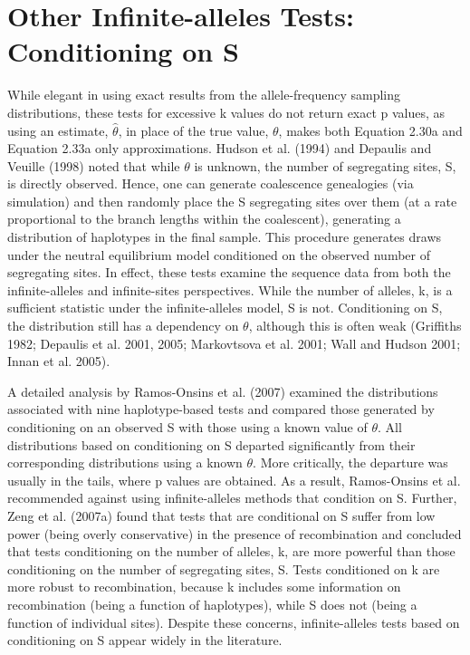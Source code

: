\documentclass{article}
\begin{document}
\section{Other Infinite-alleles Tests: Conditioning on S}
While elegant in using exact results from the allele-frequency sampling distributions, these tests for excessive k values do not return exact p values, as using an estimate,  $ \hat{\theta} $, in place of the true value,  $ \theta $, makes both Equation 2.30a and Equation 2.33a only approximations. Hudson et al. (1994) and Depaulis and Veuille (1998) noted that while  $ \theta $ is unknown, the number of segregating sites, S, is directly observed. Hence, one can generate coalescence genealogies (via simulation) and then randomly place the S segregating sites over them (at a rate proportional to the branch lengths within the coalescent), generating a distribution of haplotypes in the final sample. This procedure generates draws under the neutral equilibrium model conditioned on the observed number of segregating sites. In effect, these tests examine the sequence data from both the infinite-alleles and infinite-sites perspectives. While the number of alleles, k, is a sufficient statistic under the infinite-alleles model, S is not. Conditioning on S, the distribution still has a dependency on  $ \theta $, although this is often weak (Griffiths 1982; Depaulis et al. 2001, 2005; Markovtsova et al. 2001; Wall and Hudson 2001; Innan et al. 2005).

A detailed analysis by Ramos-Onsins et al. (2007) examined the distributions associated with nine haplotype-based tests and compared those generated by conditioning on an observed S with those using a known value of  $ \theta $. All distributions based on conditioning on S departed significantly from their corresponding distributions using a known  $ \theta $. More critically, the departure was usually in the tails, where p values are obtained. As a result, Ramos-Onsins et al. recommended against using infinite-alleles methods that condition on S. Further, Zeng et al. (2007a) found that tests that are conditional on S suffer from low power (being overly conservative) in the presence of recombination and concluded that tests conditioning on the number of alleles, k, are more powerful than those conditioning on the number of segregating sites, S. Tests conditioned on k are more robust to recombination, because k includes some information on recombination (being a function of haplotypes), while S does not (being a function of individual sites). Despite these concerns, infinite-alleles tests based on conditioning on S appear widely in the literature.
\end{document}
